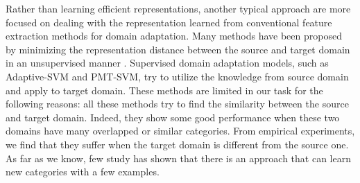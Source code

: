 Rather than learning efficient representations, another typical approach are more focused on dealing with the representation learned from conventional feature extraction methods for domain adaptation. Many methods have been proposed by minimizing the representation distance between the source and target domain in an unsupervised manner \cite{gong2012geodesic}\cite{fernando2013unsupervised}. Supervised domain adaptation models, such as Adaptive-SVM and PMT-SVM, try to utilize the knowledge from source domain and apply to target domain\cite{yang2007adapting}\cite{aytar2011tabula}. These methods are limited in our task for the following reasons: all these methods try to find the similarity between the source and target domain. Indeed, they show some good performance when these two domains have many overlapped or similar categories. From empirical experiments, we find that they suffer when the target domain is different from the source one. As far as we know, few study has shown that there is an approach that can learn new categories with a few examples.


